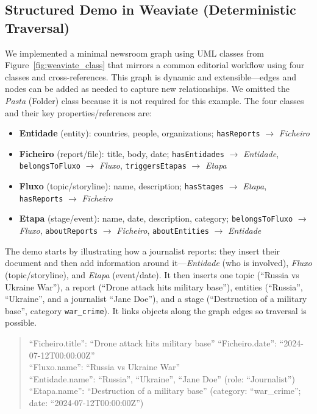 \subsection{Structured Demo in Weaviate (Deterministic Traversal)}
\label{subsec:weaviate-xref-structured}

We implemented a minimal newsroom graph using UML classes from Figure~\ref{fig:weaviate_class} that mirrors a common editorial workflow using four classes and cross-references. This graph is dynamic and extensible—edges and nodes can be added as needed to capture new relationships. We omitted the \textit{Pasta} (Folder) class because it is not required for this example. 
The four classes and their key properties/references are:
\begin{itemize}
    \item \textbf{Entidade} (entity): countries, people, organizations; \texttt{hasReports} \(\rightarrow\) \textit{Ficheiro}
    \item \textbf{Ficheiro} (report/file): title, body, date; \texttt{hasEntidades} \(\rightarrow\) \textit{Entidade}, \texttt{belongsToFluxo} \(\rightarrow\) \textit{Fluxo}, \texttt{triggersEtapas} \(\rightarrow\) \textit{Etapa}
    \item \textbf{Fluxo} (topic/storyline): name, description; \texttt{hasStages} \(\rightarrow\) \textit{Etapa}, \texttt{hasReports} \(\rightarrow\) \textit{Ficheiro}
    \item \textbf{Etapa} (stage/event): name, date, description, category; \texttt{belongsToFluxo} \(\rightarrow\) \textit{Fluxo}, \texttt{aboutReports} \(\rightarrow\) \textit{Ficheiro}, \texttt{aboutEntities} \(\rightarrow\) \textit{Entidade}
\end{itemize}

The demo starts by illustrating how a journalist reports: they insert their document and then add information around it—\textit{Entidade} (who is involved), \textit{Fluxo} (topic/storyline), and \textit{Etapa} (event/date). It then inserts one topic (\enquote{Russia vs Ukraine War}), a report (\enquote{Drone attack hits military base}), entities (\enquote{Russia}, \enquote{Ukraine}, and a journalist \enquote{Jane Doe}), and a stage (\enquote{Destruction of a military base}, category \texttt{war\_crime}). It links objects along the graph edges so traversal is possible.

\begin{quote}
\enquote{Ficheiro.title}: \enquote{Drone attack hits military base} \quad \enquote{Ficheiro.date}: \enquote{2024-07-12T00:00:00Z}\\
\enquote{Fluxo.name}: \enquote{Russia vs Ukraine War}\\
\enquote{Entidade.name}: \enquote{Russia}, \enquote{Ukraine}, \enquote{Jane Doe} (role: \enquote{Journalist})\\
\enquote{Etapa.name}: \enquote{Destruction of a military base} \quad (category: \enquote{war\_crime}; date: \enquote{2024-07-12T00:00:00Z})
\end{quote}

